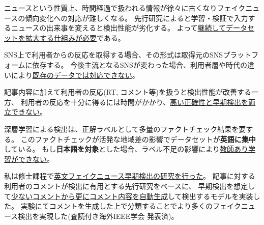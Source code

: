 \begin{description}
    \setlength{\parskip}{0cm}
    \setlength{\itemsep}{0cm}
    \item[ニュースのタイムリー性] %
        ニュースという性質上、時間経過で扱われる情報が徐々に古くなりフェイクニュースの傾向変化への対応が難しくなる。
        先行研究によると学習・検証で入力するニュースの出来事を変えると検出性能が劣化する\cite{Wang:2018:EEA:3219819.3219903}。
        よって\underline{継続してデータセットを拡大する仕組みが必要}である。
    \item[SNSプラットフォームへの依存性] %
        SNS上で利用者からの反応を取得する場合、その形式は取得元のSNSプラットフォームに依存する。
        今後主流となるSNSが変わった場合、利用者層や時代の違いにより\underline{既存のデータでは対応できない}。
    \item[早期検出と正確性の両立] %
        記事内容に加えて利用者の反応(RT, コメント等)を扱うと検出性能が改善する\cite{Wu:2018:TFF:3159652.3159677}一方、
        利用者の反応を十分に得るには時間がかかり、\underline{高い正確性と早期検出を両立できない}。
    \item[日本語データセット不足] %
        深層学習による検出は、正解ラベルとして多量のファクトチェック結果を要する。
        このファクトチェックが活発な地域差の影響でデータセットが\textbf{英語に集中}\cite{fakenewsnet}している。
        もし\textbf{日本語を対象}とした場合、ラベル不足の影響により\underline{教師あり学習ができない}。
    \end{description}

私は修士課程で\underline{英文フェイクニュース早期検出の研究を行った}。
記事に対する利用者のコメントが検出に有用とする先行研究\cite{defend}をベースに、
早期検出を想定して\underline{少ないコメントから更にコメント内容を自動生成}して検出するモデルを実装した。
実験にてコメントを生成した上で分類することでより多くのフェイクニュース検出を実現した(査読付き海外IEEE学会 発表済\cite{ines})。

